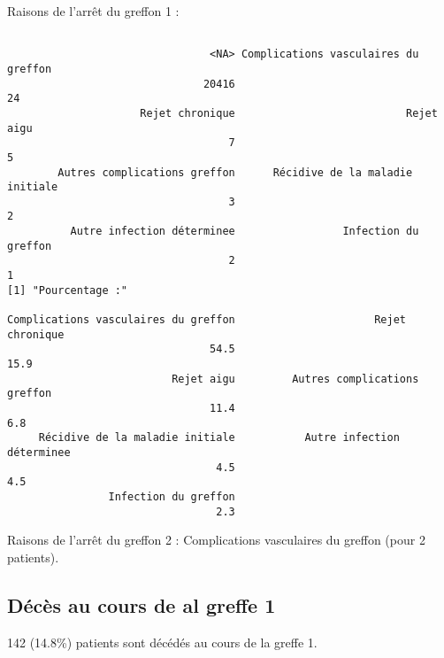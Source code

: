 \documentclass[11pt,a4paper]{article}\usepackage[]{graphicx}\usepackage[]{color}
\makeatletter
\newenvironment{kframe}{%
 \def\at@end@of@kframe{}%
 \ifinner\ifhmode%
  \def\at@end@of@kframe{\end{minipage}}%
  \begin{minipage}{\columnwidth}%
 \fi\fi%
 \def\FrameCommand##1{\hskip\@totalleftmargin \hskip-\fboxsep
 \colorbox{shadecolor}{##1}\hskip-\fboxsep
     \hskip-\linewidth \hskip-\@totalleftmargin \hskip\columnwidth}%
 \MakeFramed {\advance\hsize-\width
   \@totalleftmargin\z@ \linewidth\hsize
   \@setminipage}}%
 {\par\unskip\endMakeFramed%
 \at@end@of@kframe}
\newenvironment{knitrout}{}{} %
\makeatother
\begin{document}
Raisons de l'arrêt du greffon 1 :
\begin{knitrout}
\color{fgcolor}\begin{kframe}
\begin{verbatim}

                                <NA> Complications vasculaires du greffon 
                               20416                                   24 
                     Rejet chronique                           Rejet aigu 
                                   7                                    5 
        Autres complications greffon      Récidive de la maladie initiale 
                                   3                                    2 
          Autre infection déterminee                 Infection du greffon 
                                   2                                    1 
[1] "Pourcentage :"

Complications vasculaires du greffon                      Rejet chronique 
                                54.5                                 15.9 
                          Rejet aigu         Autres complications greffon 
                                11.4                                  6.8 
     Récidive de la maladie initiale           Autre infection déterminee 
                                 4.5                                  4.5 
                Infection du greffon 
                                 2.3 
\end{verbatim}
\end{kframe}
\end{knitrout}

Raisons de l'arrêt du greffon 2 : Complications vasculaires du greffon  (pour 2 patients).

  \subsection{Décès au cours de al greffe 1}

142 (14.8\%) patients sont décédés au cours de la greffe 1.
\end{document}
